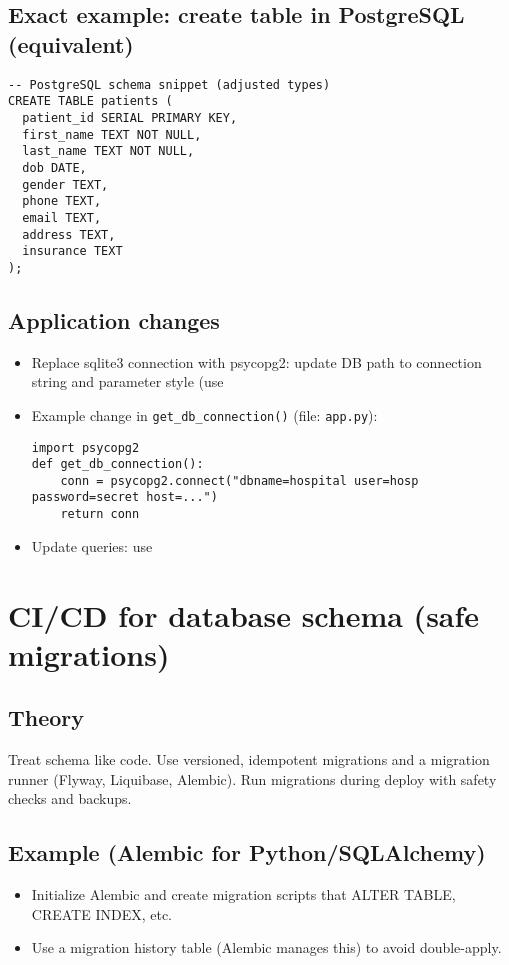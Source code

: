 \documentclass[11pt,a4paper]{article}
\begin{document}
\subsection{Exact example: create table in PostgreSQL (equivalent)}
\begin{lstlisting}
-- PostgreSQL schema snippet (adjusted types)
CREATE TABLE patients (
  patient_id SERIAL PRIMARY KEY,
  first_name TEXT NOT NULL,
  last_name TEXT NOT NULL,
  dob DATE,
  gender TEXT,
  phone TEXT,
  email TEXT,
  address TEXT,
  insurance TEXT
);
\end{lstlisting}

\subsection{Application changes}
\begin{itemize}
  \item Replace sqlite3 connection with psycopg2: update DB path to connection string and parameter style (use %
  \item Example change in \texttt{get_db_connection()} (file: \texttt{app.py}):
\begin{lstlisting}
import psycopg2
def get_db_connection():
    conn = psycopg2.connect("dbname=hospital user=hosp password=secret host=...")
    return conn
\end{lstlisting}
  \item Update queries: use %
\end{itemize}

\section{CI/CD for database schema (safe migrations)}
\subsection{Theory}
Treat schema like code. Use versioned, idempotent migrations and a migration runner (Flyway, Liquibase, Alembic). Run migrations during deploy with safety checks and backups.

\subsection{Example (Alembic for Python/SQLAlchemy)}
\begin{itemize}
  \item Initialize Alembic and create migration scripts that ALTER TABLE, CREATE INDEX, etc.
  \item Use a migration history table (Alembic manages this) to avoid double-apply.
\end{itemize}
\end{document}
